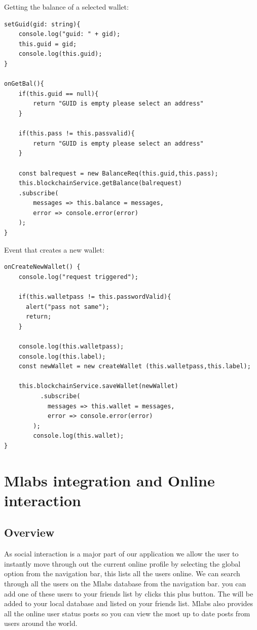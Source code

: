 Getting the balance of a selected wallet:
\begin{lstlisting}
setGuid(gid: string){
    console.log("guid: " + gid);
    this.guid = gid;
    console.log(this.guid);
}

onGetBal(){
    if(this.guid == null){
        return "GUID is empty please select an address"
    }

    if(this.pass != this.passvalid){
        return "GUID is empty please select an address"
    }

    const balrequest = new BalanceReq(this.guid,this.pass);
    this.blockchainService.getBalance(balrequest)
    .subscribe(
        messages => this.balance = messages,
        error => console.error(error)
    );
}
\end{lstlisting}

Event that creates a new wallet:
\begin{lstlisting}
onCreateNewWallet() {
    console.log("request triggered");

    if(this.walletpass != this.passwordValid){
      alert("pass not same");
      return;
    }

    console.log(this.walletpass);
    console.log(this.label);
    const newWallet = new createWallet (this.walletpass,this.label);
    
    this.blockchainService.saveWallet(newWallet)
          .subscribe(
            messages => this.wallet = messages,
            error => console.error(error)
        );
        console.log(this.wallet);
}
\end{lstlisting}

\section{Mlabs integration and Online interaction}

\subsection{Overview}
As social interaction is a major part of our application we allow the user to instantly move through out the current online profile by selecting the global option from the navigation bar, this lists all the users online. We can search through all the users on the Mlabs database from the navigation bar. you can add one of these users to your friends list by clicks this plus button. The will be added to your local database and listed on your friends list. Mlabs also provides all the online user status posts so you can view the most up to date posts from users around the world.


